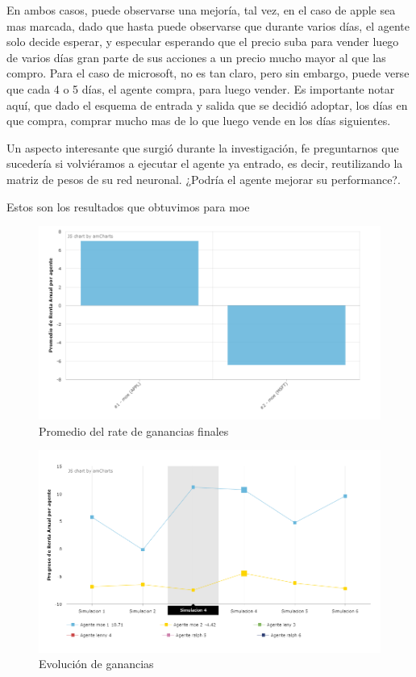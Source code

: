 En ambos casos, puede observarse una mejoría, tal vez, en el caso de apple sea mas marcada, dado que hasta puede observarse que durante varios días, el agente solo decide esperar, y especular esperando que el precio suba para vender luego de varios días gran parte de sus acciones a un precio mucho mayor al que las compro.
Para el caso de microsoft, no es tan claro, pero sin embargo, puede verse que cada 4 o  5 días, el agente compra, para luego vender. Es importante notar aquí, que dado el esquema de entrada y salida que se decidió adoptar, los días en que compra, comprar mucho mas de lo que luego vende en los días siguientes.

Un aspecto interesante que surgió durante la investigación, fe preguntarnos que sucedería si volviéramos a ejecutar el agente ya entrado, es decir, reutilizando la matriz de pesos de su red neuronal.
¿Podría el agente mejorar su performance?.

Estos son los resultados que obtuvimos para moe

\begin{figure}[h!]
	\includegraphics[scale=0.7]{imagenes/moe_results_1.png}
	\caption{Promedio del rate de ganancias finales}
\end{figure}

\begin{figure}[h!]
	\includegraphics[scale=0.7]{imagenes/moe_results_2.png}
	\caption{Evolución de ganancias}
\end{figure}

